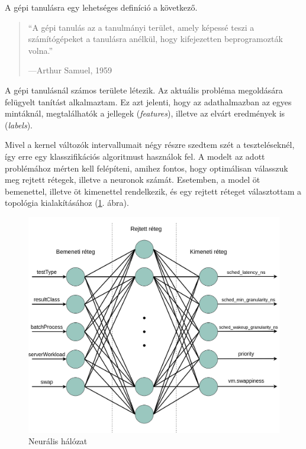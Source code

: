 A gépi tanulásra egy lehetséges definíció a következő.

\begin{quote}
``A gépi tanulás az a tanulmányi terület, amely képessé teszi a számítógépeket a tanulásra
anélkül, hogy kifejezetten beprogramozták volna.''
\par\nobreak\smallskip\hfill—Arthur Samuel, 1959
\end{quote}

A gépi tanulásnál számos területe létezik. Az aktuális probléma megoldására felügyelt tanítást alkalmaztam. Ez azt jelenti, hogy az adathalmazban az egyes mintáknál, megtalálhatók a jellegek (\textit{features}), illetve az elvárt eredmények is (\textit{labels}).

Mivel a kernel változók intervallumait négy részre szedtem szét a teszteléseknél, így erre egy klasszifikációs algoritmust használok fel.
A modelt az adott problémához mérten kell felépíteni, amihez fontos, hogy optimálisan válasszuk meg rejtett rétegek, illetve a neuronok számát.
Esetemben, a model öt bemenettel, illetve öt kimenettel rendelkezik, és egy rejtett réteget választottam a topológia kialakításához (\ref{fig:neuralnetwork}. ábra).

\begin{figure}[h!]
\centering
\includegraphics[width=\textwidth]{images/neuralNetwork.png}
\caption{Neurális hálózat}
\label{fig:neuralnetwork}
\end{figure}

